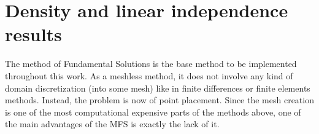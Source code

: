 \label{chap:numerical}

\section{Density and linear independence results}

The method of Fundamental Solutions is the base method to be implemented throughout this work. As a meshless method, it does not involve any kind of domain discretization (into some mesh) like in finite differences or finite elements methods. Instead, the problem is now of point placement. Since the mesh creation is one of the most computational expensive parts of the methods above, one of the main advantages of the MFS is exactly the lack of it. 

